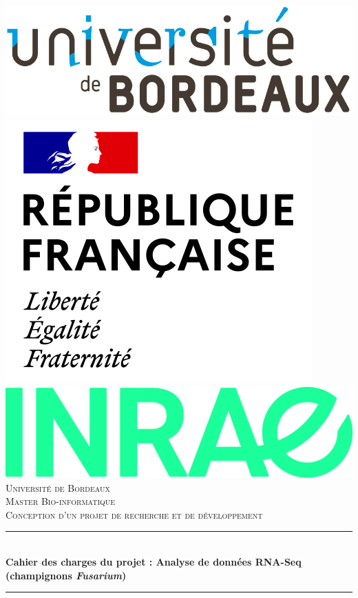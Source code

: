 \documentclass{report}
\begin{document}
\begin{titlepage}
\newcommand{\HRule}{\rule{\linewidth}{0.5mm}}
\newcommand{\reportyear}{Avril 2024}
\center

\includegraphics[scale=0.2]{Images/logo_ub.png}
\hspace{3.61cm}
\includegraphics[scale=0.15]{Images/logo_fr.png}
\includegraphics[scale=0.5]{Images/logo_inrae.jpg}\\[2cm]


\textsc{\Large Université de Bordeaux}\\[0.2cm]
\textsc{\Large Master Bio-informatique}\\[0.2cm]
\textsc{\Large Conception d'un projet de recherche et de développement}\\[1cm]
\HRule \\[0.6cm]
{ \huge \bfseries Cahier des charges du projet : Analyse de données RNA-Seq (champignons \textit{Fusarium})}\\[0.5cm]
\HRule \\[1cm]


\end{titlepage}
\end{document}
